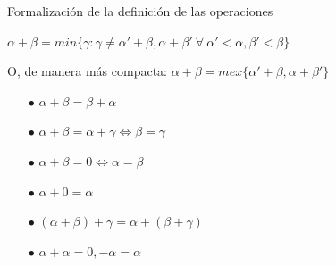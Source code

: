 \documentclass[10pt,spanish]{beamer}
\begin{document}
\begin{frame}{Formalización de la definición de las operaciones}

\begin{definition}[Suma]
	$\alpha + \beta = min \{\gamma: \gamma \neq \alpha' + \beta, \alpha + \beta'\ \forall\ \alpha'<\alpha, \beta'<\beta \}$
	
	O, de manera más compacta:
	$\alpha + \beta = mex\{ \alpha'+\beta, \alpha+\beta'\}$
\end{definition}


\begin{theorem}
	\begin{itemize}
		\item[]
		\item[$\bullet$]$\alpha + \beta = \beta + \alpha$
		\item[$\bullet$]$\alpha + \beta = \alpha + \gamma \Leftrightarrow \beta = \gamma$
		\item[$\bullet$]$\alpha + \beta = 0 \Leftrightarrow \alpha = \beta$
		\item[$\bullet$]$\alpha + 0 = \alpha$
		\item[$\bullet$]$(\alpha + \beta) + \gamma = \alpha + (\beta + \gamma)$
		\item[$\bullet$]$\alpha + \alpha = 0, -\alpha = \alpha$
	\end{itemize}
\end{theorem}


\end{frame}
\end{document}
